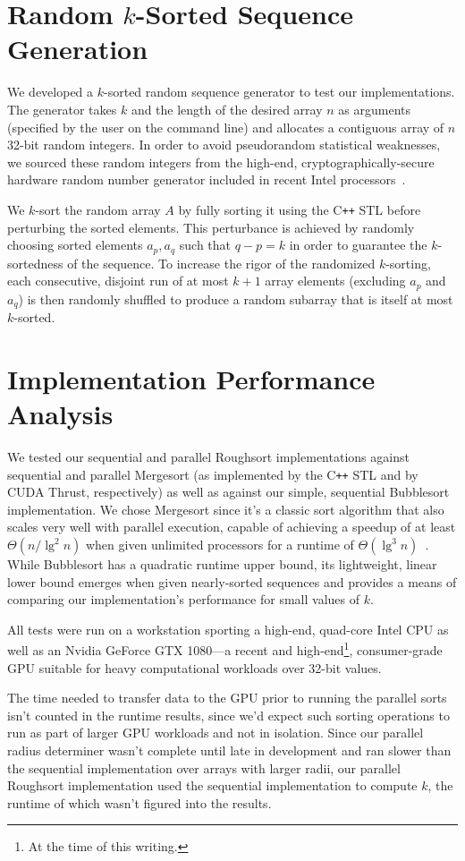 \documentclass[letterpaper, 12pt]{article}
\let\supercite\cite
\renewcommand{\cite}[1]{\textnormal{~\supercite{#1}}}
\begin{document}
\section{Random $k$-Sorted Sequence Generation}
We developed a $k$-sorted random sequence generator to test our implementations.
The generator takes $k$ and the length of the desired array $n$ as arguments (specified by the user on the command line) and
  allocates a contiguous array of $n$ 32-bit random integers.
In order to avoid pseudorandom statistical weaknesses, we sourced these random integers from the high-end,
   cryptographically-secure hardware random number generator included in recent Intel processors\cite{intel12}.

We $k$-sort the random array $A$ by fully sorting it using the C\texttt{++} STL before perturbing the sorted elements.
This perturbance is achieved by randomly choosing sorted elements $a_p, a_q$ such that $q - p = k$ in order to guarantee the
  $k$-sortedness of the sequence.
To increase the rigor of the randomized $k$-sorting, each consecutive, disjoint run of at most $k + 1$ array elements
  (excluding $a_p$ and $a_q$) is then randomly shuffled to produce a random subarray that is itself at most $k$-sorted.

\section{Implementation Performance Analysis}
We tested our sequential and parallel Roughsort implementations against sequential and parallel Mergesort (as implemented by
  the C\texttt{++} STL and by CUDA Thrust, respectively) as well as against our simple, sequential Bubblesort implementation.
We chose Mergesort since it's a classic sort algorithm that also scales very well with parallel execution, capable
  of achieving a speedup of at least $\Theta(n / \lg^2 n)$ when given unlimited processors for a runtime of
  $\Theta(\lg^3 n)$\cite{clrs}.
While Bubblesort has a quadratic runtime upper bound, its lightweight, linear lower bound emerges when given nearly-sorted
  sequences and provides a means of comparing our implementation's performance for small values of $k$.

All tests were run on a workstation sporting a high-end, quad-core Intel CPU as well as an Nvidia GeForce GTX 1080---a
  recent and high-end\footnote{At the time of this writing.}, consumer-grade GPU suitable for heavy computational workloads
  over 32-bit values.

The time needed to transfer data to the GPU prior to running the parallel sorts isn't counted in the runtime results, since we'd
  expect such sorting operations to run as part of larger GPU workloads and not in isolation.
Since our parallel radius determiner wasn't complete until late in development and ran slower than the sequential
  implementation over arrays with larger radii, our parallel Roughsort implementation used the sequential implementation to
  compute $k$, the runtime of which wasn't figured into the results.
\end{document}
